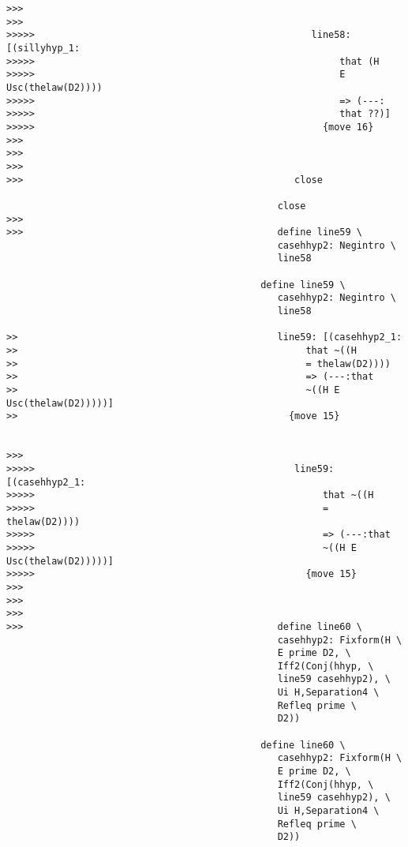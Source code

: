 \documentclass[12pt]{article}
\begin{document}
\begin{verbatim}
>>>
>>>
>>>>>                                                 line58: [(sillyhyp_1:
>>>>>                                                      that (H
>>>>>                                                      E Usc(thelaw(D2))))
>>>>>                                                      => (---:
>>>>>                                                      that ??)]
>>>>>                                                   {move 16}
>>>
>>>
>>>
>>>                                                close

                                                close
>>>
>>>                                             define line59 \
                                                casehhyp2: Negintro \
                                                line58

                                             define line59 \
                                                casehhyp2: Negintro \
                                                line58

>>                                              line59: [(casehhyp2_1:
>>                                                   that ~((H
>>                                                   = thelaw(D2))))
>>                                                   => (---:that
>>                                                   ~((H E Usc(thelaw(D2)))))]
>>                                                {move 15}


>>>
>>>>>                                              line59: [(casehhyp2_1:
>>>>>                                                   that ~((H
>>>>>                                                   = thelaw(D2))))
>>>>>                                                   => (---:that
>>>>>                                                   ~((H E Usc(thelaw(D2)))))]
>>>>>                                                {move 15}
>>>
>>>
>>>
>>>                                             define line60 \
                                                casehhyp2: Fixform(H \
                                                E prime D2, \
                                                Iff2(Conj(hhyp, \
                                                line59 casehhyp2), \
                                                Ui H,Separation4 \
                                                Refleq prime \
                                                D2))

                                             define line60 \
                                                casehhyp2: Fixform(H \
                                                E prime D2, \
                                                Iff2(Conj(hhyp, \
                                                line59 casehhyp2), \
                                                Ui H,Separation4 \
                                                Refleq prime \
                                                D2))


\end{verbatim}
\end{document}
